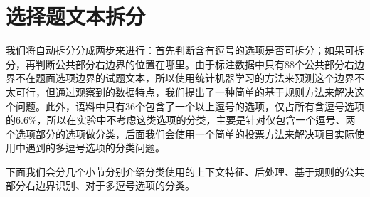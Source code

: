 \documentclass[master, winfont]{njuthesis}
\begin{document}
\section{选择题文本拆分}
\label{section:split_method}

我们将自动拆分分成两步来进行：首先判断含有逗号的选项是否可拆分；如果可拆分，再判断公共部分右边界的位置在哪里。由于标注数据中只有88个公共部分右边界不在题面选项边界的试题文本，所以使用统计机器学习的方法来预测这个边界不太可行，但通过观察到的数据特点，我们提出了一种简单的基于规则方法来解决这个问题。此外，语料中只有36个包含了一个以上逗号的选项，仅占所有含逗号选项的6.6\%，所以在实验中不考虑这类选项的分类，主要是针对仅包含一个逗号、两个选项部分的选项做分类，后面我们会使用一个简单的投票方法来解决项目实际使用中遇到的多逗号选项的分类问题。

下面我们会分几个小节分别介绍分类使用的上下文特征、后处理、基于规则的公共部分右边界识别、对于多逗号选项的分类。
\end{document}
